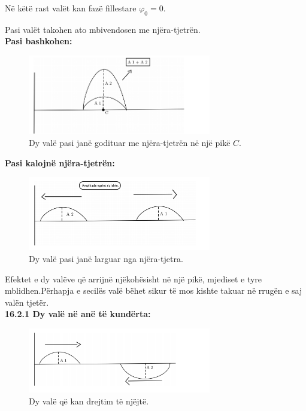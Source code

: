 \documentclass[twocolumn]{article}
\begin{document}
Në këtë rast valët kan fazë fillestare $\varphi_0=0$.


Pasi valët takohen ato mbivendosen me njëra-tjetrën.\\
	
\textbf{	Pasi bashkohen:}

	\begin{figure}[h]
	\includegraphics[width=80mm]{Imazhet/mbivendosja2.png}
	\caption{ Dy valë pasi janë godituar me njëra-tjetrën
		në një pikë $C$.}
	\label{fig:boat1}
\end{figure}

\textbf{Pasi kalojnë njëra-tjetrën:}
	
		\begin{figure}[h]
		\includegraphics[width=80mm]{Imazhet/mbivendosja3.png}
		\caption{ Dy valë pasi janë larguar nga njëra-tjetra.}
		\label{fig:boat1}
	\end{figure}

Efektet e dy valëve që arrijnë njëkohësisht në një
pikë, mjediset e tyre  mblidhen.Përhapja e secilës valë bëhet
sikur të mos kishte takuar në rrugën e saj valën tjetër.
\\


\textbf{16.2.1 Dy valë në anë të kundërta:}

	\begin{figure}[h]
	\includegraphics[width=80mm]{Imazhet/mbivendosja4.png}
	\caption{ Dy valë që kan drejtim të njëjtë.}
	\label{fig:boat1}
\end{figure}
\end{document}
